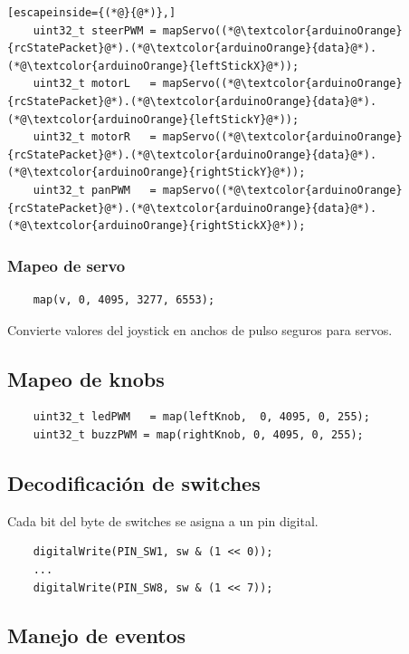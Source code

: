 \documentclass[12pt,a4paper]{article}
\begin{document}
\begin{lstlisting}[escapeinside={(*@}{@*)},]
	uint32_t steerPWM = mapServo((*@\textcolor{arduinoOrange}{rcStatePacket}@*).(*@\textcolor{arduinoOrange}{data}@*).(*@\textcolor{arduinoOrange}{leftStickX}@*));
	uint32_t motorL   = mapServo((*@\textcolor{arduinoOrange}{rcStatePacket}@*).(*@\textcolor{arduinoOrange}{data}@*).(*@\textcolor{arduinoOrange}{leftStickY}@*));
	uint32_t motorR   = mapServo((*@\textcolor{arduinoOrange}{rcStatePacket}@*).(*@\textcolor{arduinoOrange}{data}@*).(*@\textcolor{arduinoOrange}{rightStickY}@*));
	uint32_t panPWM   = mapServo((*@\textcolor{arduinoOrange}{rcStatePacket}@*).(*@\textcolor{arduinoOrange}{data}@*).(*@\textcolor{arduinoOrange}{rightStickX}@*));
\end{lstlisting}

\subsubsection{Mapeo de servo}

\begin{lstlisting}
	map(v, 0, 4095, 3277, 6553);
\end{lstlisting}

Convierte valores del joystick en anchos de pulso seguros para servos.

\subsection{Mapeo de knobs}

\begin{lstlisting}
	uint32_t ledPWM   = map(leftKnob,  0, 4095, 0, 255);
	uint32_t buzzPWM = map(rightKnob, 0, 4095, 0, 255);
\end{lstlisting}

\subsection{Decodificación de switches}

Cada bit del byte de switches se asigna a un pin digital.

\begin{lstlisting}
	digitalWrite(PIN_SW1, sw & (1 << 0));
	...
	digitalWrite(PIN_SW8, sw & (1 << 7));
\end{lstlisting}

\subsection{Manejo de eventos}
\end{document}
